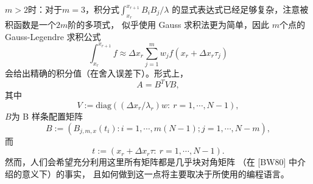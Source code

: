 $m>2$时：对于$m=3$，积分式$\int_{x_{r}}^{x_{r+1}}B_{i}B_{j}/\lambda$
的显式表达式已经足够复杂，注意被积函数是一个$2m$阶的多项式，
似乎使用 Gauss 求积法更为简单，因此
$m$个点的 Gauss-Legendre 求积公式
\begin{displaymath}
  \int_{x_{r}}^{x_{r+1}}f
  \approx
  \Delta x_{r}\sum_{j=1}^{m}w_{j}f(x_{r}+\Delta x_{r}\tau_{j})
\end{displaymath}
会给出精确的积分值（在舍入误差下）。形式上，
\begin{displaymath}
  A=B^{T}VB,
\end{displaymath}
其中
\begin{displaymath}
  V:=\text{diag}((\Delta x_{r}/\lambda_{r})w:\ r=1,\cdots,N-1),
\end{displaymath}
$B$为 B 样条配置矩阵
\begin{displaymath}
  B:=(B_{j,m,x}(t_{i}):i=1,\cdots,m(N-1);j=1,\cdots,N-m),
\end{displaymath}
而
\begin{displaymath}
  t:=(x_{r}+\Delta x_{r}\tau:\ r=1,\cdots,N-1).
\end{displaymath}
然而，人们会希望充分利用这里所有矩阵都是几乎块对角矩阵
（在 [BW80] 中介绍的意义下）的事实，
且如何做到这一点将主要取决于所使用的编程语言。


\begingroup
    \printbibliography[title={外文翻译参考文献}]
\endgroup
